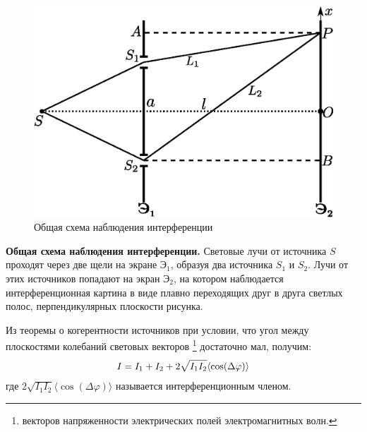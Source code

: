 ﻿\documentclass[__main__.tex]{subfiles}
\begin{document}
\begin{figure}
	\includegraphics[width=1\linewidth]{img/o-05_1}{}
	\caption{Общая схема наблюдения интерференции}
\end{figure}

\textbf{Общая схема наблюдения интерференции.}
Световые лучи от источника $S$ проходят через две щели на экране $\text{Э}_1$, образуя два источника $S_1$ и $S_2$. Лучи от этих источников попадают на экран $\text{Э}_2$, на котором наблюдается интерференционная картина в виде плавно переходящих друг в друга светлых полос, перпендикулярных плоскости рисунка.

Из теоремы о когерентности источников при условии, что угол между плоскостями колебаний световых векторов
\footnote{
	векторов напряженности электрических полей электромагнитных волн.
}
достаточно мал, получим:
\begin{gather}
\llabel{o-02-mainint}
I = I_1 + I_2 + 2\sqrt{I_1 I_2}\langle\cos(\Delta \varphi)\rangle
\end{gather}
где $2\sqrt{I_1 I_2}\langle\cos(\Delta \varphi)\rangle$ называется интерференционным членом.
\end{document}
